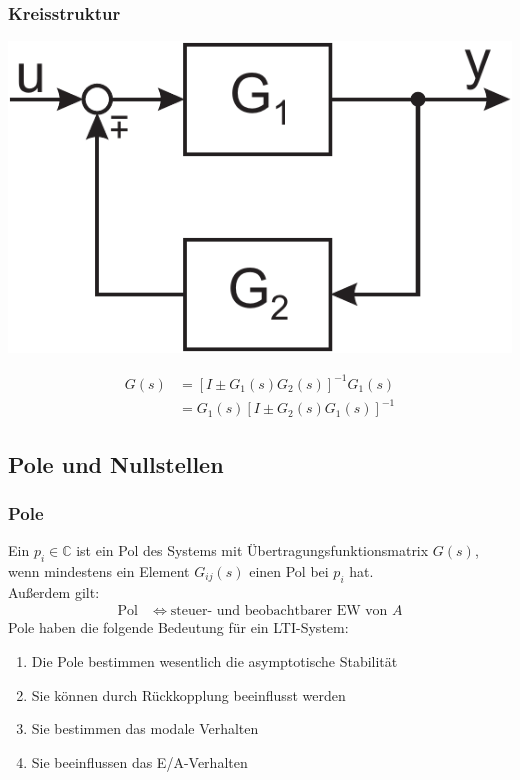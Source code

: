 \documentclass[a4paper,twocolumn,10pt]{article}
\begin{document}
\subsubsection{Kreisstruktur}
\begin{center}
\includegraphics[width=0.5\columnwidth]{Grafiken/Kreisstruktur}
\end{center}
\begin{equation*}
\begin{split}
G(s)&=[I\pm G_1(s)G_2(s)]^{-1}G_1(s)\\
&=G_1(s)[I\pm G_2(s)G_1(s)]^{-1}
\end{split}
\end{equation*}

\subsection{Pole und Nullstellen}
\subsubsection{Pole}
Ein $p_i\in\mathbb{C}$ ist ein Pol des Systems mit Übertragungsfunktionsmatrix $G(s)$, wenn mindestens ein Element $G_{ij}(s)$ einen Pol bei $p_i$ hat.\\
Außerdem gilt:
\begin{equation*}
\begin{split}
\text{Pol}&\Leftrightarrow \text{steuer- und beobachtbarer EW von }A
\end{split}
\end{equation*}
Pole haben die folgende Bedeutung für ein LTI-System:
\begin{enumerate}[label=$\bullet$]
\item Die Pole bestimmen wesentlich die asymptotische Stabilität
\item Sie können durch Rückkopplung beeinflusst werden
\item Sie bestimmen das modale Verhalten
\item Sie beeinflussen das E/A-Verhalten
\end{enumerate}
\end{document}
